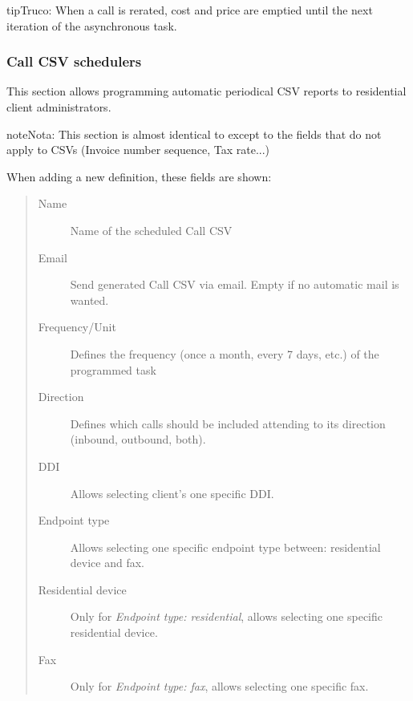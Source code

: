 \documentclass[letterpaper,10pt,spanish]{sphinxmanual}
\begin{document}
\begin{notice}{tip}{Truco:}
When a call is rerated, cost and price are emptied until the next iteration of the asynchronous task.
\end{notice}


\subsubsection{Call CSV schedulers}
\label{administration_portal/client/residential/calls/call_csv_schedulers:call-csv-schedulers}\label{administration_portal/client/residential/calls/call_csv_schedulers::doc}
This section allows programming automatic periodical CSV reports to residential client administrators.

\begin{notice}{note}{Nota:}
This section is almost identical to {\hyperref[administration_portal/brand/invoicing/invoice_schedulers:invoice\string-schedulers]{}} except to the
fields that do not apply to CSVs (Invoice number sequence, Tax rate...)
\end{notice}

When adding a new definition, these fields are shown:
\begin{quote}
\begin{description}
\item[{Name}] \leavevmode
Name of the scheduled Call CSV

\item[{Email}] \leavevmode
Send generated Call CSV via email. Empty if no automatic mail is wanted.

\item[{Frequency/Unit}] \leavevmode
Defines the frequency (once a month, every 7 days, etc.) of the programmed task

\item[{Direction}] \leavevmode
Defines which calls should be included attending to its direction (inbound, outbound, both).

\item[{DDI}] \leavevmode
Allows selecting client's one specific DDI.

\item[{Endpoint type}] \leavevmode
Allows selecting one specific endpoint type between: residential device and fax.

\item[{Residential device}] \leavevmode
Only for \emph{Endpoint type: residential}, allows selecting one specific residential device.

\item[{Fax}] \leavevmode
Only for \emph{Endpoint type: fax}, allows selecting one specific fax.

\end{description}
\end{quote}
\end{document}
